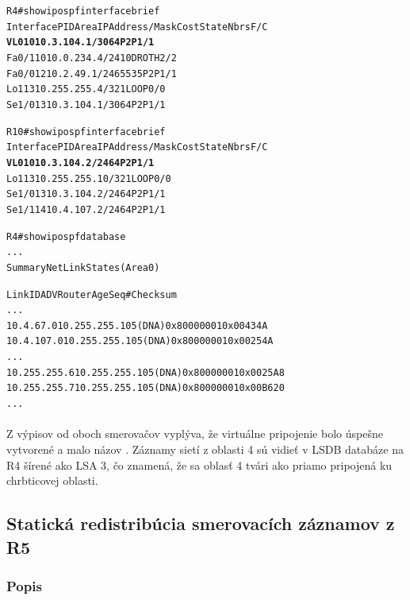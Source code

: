 \documentclass[12pt,twoside,a4paper]{report}
\begin{document}
\noindent
{\selectfont
\begin{small}
\begin{alltt}
R4#show ip ospf interface brief 
Interface    PID   Area            IP Address/Mask    Cost  State Nbrs F/C
\textbf{VL0          1     0               10.3.104.1/30      64    P2P   1/1}
Fa0/1        1     0               10.0.234.4/24      10    DROTH 2/2
Fa0/0        1     2               10.2.49.1/24       65535 P2P   1/1
Lo1          1     3               10.255.255.4/32    1     LOOP  0/0
Se1/0        1     3               10.3.104.1/30      64    P2P   1/1


R10#show ip ospf interface brief 
Interface    PID   Area            IP Address/Mask    Cost  State Nbrs F/C
\textbf{VL0          1     0               10.3.104.2/24      64    P2P   1/1}
Lo1          1     3               10.255.255.10/32   1     LOOP  0/0
Se1/0        1     3               10.3.104.2/24      64    P2P   1/1
Se1/1        1     4               10.4.107.2/24      64    P2P   1/1



R4#show ip ospf database 
...
		Summary Net Link States (Area 0)

Link ID         ADV Router      Age         Seq#       Checksum
...
10.4.67.0       10.255.255.10   5     (DNA) 0x80000001 0x00434A
10.4.107.0      10.255.255.10   5     (DNA) 0x80000001 0x00254A
...
10.255.255.6    10.255.255.10   5     (DNA) 0x80000001 0x0025A8
10.255.255.7    10.255.255.10   5     (DNA) 0x80000001 0x00B620
...
\end{alltt}
\end{small}
}

\paragraph{}
Z výpisov od oboch smerovačov vyplýva, že virtuálne pripojenie bolo úspešne vytvorené a malo názov . Záznamy sietí z oblasti 4 sú vidieť v LSDB databáze na R4 šírené ako LSA 3, čo znamená, že sa oblasť 4 tvári ako priamo pripojená ku chrbticovej oblasti.

\subsection{Statická redistribúcia smerovacích záznamov z R5}
\subsubsection{Popis}
\end{document}
